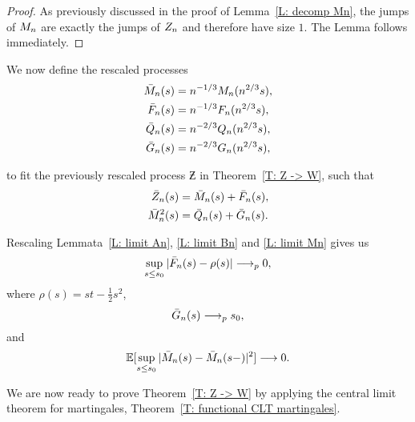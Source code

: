 \begin{proof} \label{P: limit Mn}
	As previously discussed in the proof of Lemma~\ref{L: decomp Mn}, 
	the jumps of $M_n$ are exactly the jumps of $Z_n$ and therefore have size $1$. 
	The Lemma follows immediately.
\end{proof}


We now define the rescaled processes 
\begin{equation}
\begin{aligned}
\bar{M}_n(s) &= n^{-1 / 3}M_n(n^{2 / 3}s), \\
\bar{F}_n(s) &= n^{-1 / 3}F_n(n^{2 / 3}s), \\
\bar{Q}_n(s) &= n^{-2 / 3}Q_n(n^{2 / 3}s), \\
\bar{G}_n(s) &= n^{-2 / 3}G_n(n^{2 / 3}s),
\end{aligned} 	
\end{equation}

to fit the previously rescaled process 
$\Zbar$ in Theorem~\ref{T: Z -> W}, such that
\begin{equation}
\begin{aligned}
\bar{Z}_n(s) &= \bar{M}_n(s) + \bar{F}_n(s), \\
\bar{M}_n^2(s) &= \bar{Q}_n(s) + \bar{G}_n(s).
\end{aligned}	
\end{equation}

Rescaling Lemmata~\ref{L: limit An}, \ref{L: limit Bn} and \ref{L: limit Mn} gives us
\begin{equation} \label{E: limit An rescaled}
\sup_{s \leq s_0} |\bar{F}_n(s) - \rho (s)| \longrightarrow_p 0,
\end{equation}
where $\rho (s) = st - \frac{1}{2}s^2$,
\begin{equation} \label{E: limit Bn rescaled}
\bar{G}_n(s) \longrightarrow_p s_0,
\end{equation}
and
\begin{equation} \label{E: limit Mn rescaled}
\mathbb{E}[\sup_{s \leq s_0} | \bar{M}_n(s) - \bar{M}_n(s-) |^2 ] \longrightarrow 0.
\end{equation}

We are now ready to prove Theorem~\ref{T: Z -> W} by applying the central limit theorem for martingales, Theorem~\ref{T: functional CLT martingales}.

